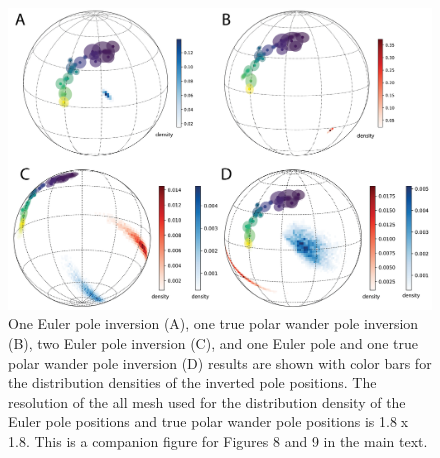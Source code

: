 \documentclass[11pt,letterpaper]{article}
\begin{document}
\begin{figure}[h!]
\noindent\includegraphics[width=\textwidth]{SI_Kewee.png}
\caption[Companion figure for main text Figures 8 and 9 with Euler pole density color bar]{One Euler pole inversion (A), one true polar wander pole inversion (B), two Euler pole inversion (C), and one Euler pole and one true polar wander pole inversion (D) results are shown with color bars for the distribution densities of the inverted pole positions. The resolution of the all mesh used for the distribution density of the Euler pole positions and true polar wander pole positions is 1.8\textdegree$\;$x 1.8\textdegree. This is a companion figure for Figures 8 and 9 in the main text. }
\label{pdffiguresample}
\end{figure}
\end{document}
